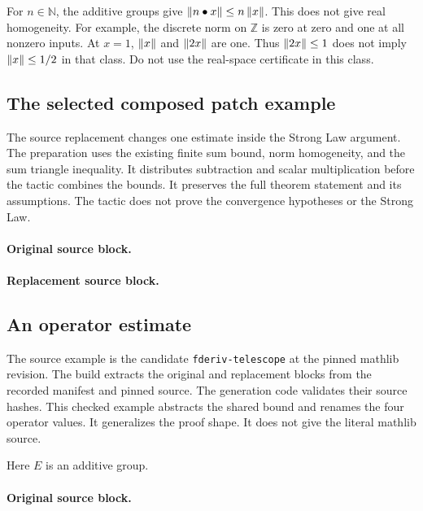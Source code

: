 For $n\in\mathbb N$, the additive groups give $\left\lVert n\mathbin{\bullet}x\right\rVert\le n\left\lVert x\right\rVert$.
This does not give real homogeneity.
For example, the discrete norm on $\mathbb Z$ is zero at zero and one at all nonzero inputs.
At $x=1$, $\left\lVert x\right\rVert$ and $\left\lVert2x\right\rVert$ are one.
Thus $\left\lVert2x\right\rVert\le1$ does not imply $\left\lVert x\right\rVert\le1/2$ in that class.
Do not use the real-space certificate in this class.

\subsection{The selected composed patch example}
\begingroup\raggedright

\par\endgroup
The source replacement changes one estimate inside the Strong Law argument.
The preparation uses the existing finite sum bound, norm homogeneity, and the sum triangle inequality.
It distributes subtraction and scalar multiplication before the tactic combines the bounds.
It preserves the full theorem statement and its assumptions.
The tactic does not prove the convergence hypotheses or the Strong Law.
\paragraph{Original source block.}
\paragraph{Replacement source block.}

\subsection{An operator estimate}
The source example is the candidate \texttt{fderiv-telescope} at the pinned mathlib revision.
The build extracts the original and replacement blocks from the recorded manifest and pinned source.
The generation code validates their source hashes.
This checked example abstracts the shared bound and renames the four operator values.
It generalizes the proof shape.
It does not give the literal mathlib source.

Here $E$ is an additive group.

\paragraph{Original source block.}

